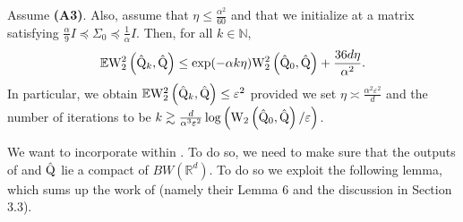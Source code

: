\begin{theorem}
\label{th: lambert}
Assume \textbf{(A3)}. Also, assume that $\eta \leq \frac{\alpha^2}{60}$ and that we initialize  at a matrix satisfying $\frac{\alpha}{9} I \preceq \Sigma_{0} \preceq \frac{1}{\alpha} I$. Then, for all $k \in \mathbb{N}$,
$$
\mathbb{E} \mathrm{W}_{2}^2\left(\hat{\mathrm{Q}}_k, \hat{\mathrm{Q}}\right) \leq \exp (-\alpha k \eta) \mathrm{W}_{2}^2\left(\hat{\mathrm{Q}}_0, \hat{\mathrm{Q}}\right)+\frac{36 d \eta}{\alpha^2} .
$$
In particular, we obtain $\mathbb{E} \mathrm{W}_{2}^2\left(\hat{\mathrm{Q}}_k, \hat{\mathrm{Q}}\right) \leq \varepsilon^2$ provided we set $\eta \asymp \frac{\alpha^2 \varepsilon^2}{d}$ and the number of iterations to be $k \gtrsim \frac{d}{\alpha^3 \varepsilon^2} \log \left(\mathrm{W}_{2}\left(\hat{\mathrm{Q}}_0, \hat{\mathrm{Q}}\right) / \varepsilon\right)$.
\end{theorem}
We want to incorporate  within . To do so, we need to make sure that the outputs of  and $\hat{\mathrm{Q}}$ lie a compact of $BW(\mathbb{R}^d)$. To do so we exploit the following lemma, which sums up the work of \citet{lambert2022variational} (namely their Lemma 6 and the discussion in Section 3.3). 

